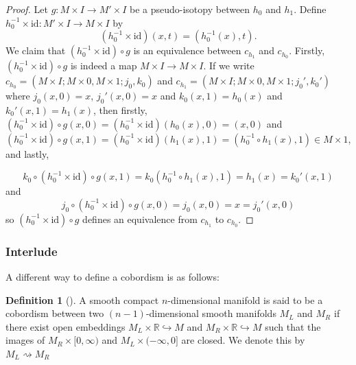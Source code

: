 \documentclass[reqno]{amsart}
\theoremstyle{definition}
\newtheorem{definition}[theorem]{Definition}
\theoremstyle{remark}
\newcommand{\id}{{\mathrm{id}}}
\begin{document}
    \begin{proof}
        Let $g \colon M \times I \to M' \times I$ be a
        pseudo-isotopy between $h_0$ and $h_1$.
        Define
        $h_0^{-1} \times \id \colon M' \times I
        \to M \times I$ by
        \[
            \left( h_0^{-1} \times \id \right) (x,t)
            = \left( h_0^{-1}(x),t \right) .
        \] 
        We claim that
        $\left( h_0^{-1} \times \id \right) \circ g$ 
        is an equivalence 
        between $c_{h_1}$ and $c_{h_0}$.
        Firstly, 
        $\left( h_0^{-1}\times \id \right) 
        \circ g$ is indeed a map
        $M \times I \to M \times I$.
        If we write
        $c_{h_0} = 
        \left( M \times I; M \times 0,
        M \times 1; j_0, k_0 \right) $ and
        $c_{h_1} = \left( M \times I; M \times 0,
        M \times 1; j_0', k_0' \right) $ where
        $j_0(x,0) = x$,
        $j_0'(x,0) = x$ and
        $k_0(x,1) = h_0(x)$ and
        $k_0'(x,1) = h_1(x)$, then firstly,
        $\left( h_0^{-1}\times \id \right) \circ g
        (x,0) = \left( h_0^{-1} \times \id \right) 
        \left( h_0(x),0 \right) 
        = (x,0)$ and
        $\left( h_0^{-1} \times \id \right) \circ
        g(x,1) = \left( h_0^{-1} \times \id \right) 
        \left( h_1(x),1 \right) 
        = \left( h_0^{-1}\circ h_1(x),1 \right)
        \in M \times 1$, and lastly,

        \[
        k_0 \circ \left( h_0^{-1} \times \id \right) \circ g
        (x,1) = 
        k_0 \left( h_0^{-1} \circ h_1(x),1 \right) 
        = h_1(x) = 
        k_0' (x,1) 
        \] 
        and
        \[
        j_0 \circ \left( h_0^{-1} \times \id \right) 
        \circ g(x,0) = 
        j_0 (x,0) = x = 
        j_0' (x,0)
        \] 
        so
        $\left( h_0^{-1} \times \id \right) \circ g$ defines
        an equivalence from
        $c_{h_1}$ to $c_{h_0}$.
    \end{proof}


    \subsubsection{Interlude}

        A different way to define a cobordism is as follows:

        \begin{definition}[]
        A smooth compact $n$-dimensional manifold is
        said to be a cobordism between two $(n-1)$-dimensional
        smooth manifolds $M_L$ and $M_R$ if
        there exist open embeddings
        $M_L \times \mathbb{R} \hookrightarrow M$ and
        $M_R \times \mathbb{R} \hookrightarrow
        M$ such that
        the images of
        $M_R \times [0, \infty)$ and
        $M_L \times (-\infty, 0]$ are closed.
        We denote this by
        $M_L \rightsquigarrow M_R$
        \end{definition}
\end{document}
